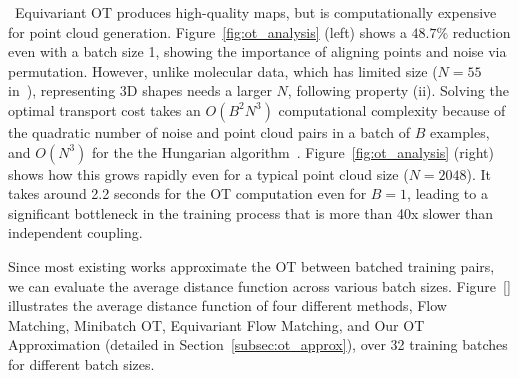  \
Equivariant OT produces high-quality maps, but is computationally expensive for point cloud generation. %
Figure~\ref{fig:ot_analysis} (left) shows a $48.7\%$ reduction even with a batch size 1, showing the importance of aligning points and noise via permutation.
However, unlike molecular data, which has limited size ($N$$=$$55$ in~\cite{klein2024equivariant}), representing 3D shapes needs a larger $N$, following property (ii). 
Solving the optimal transport cost takes an $O(B^2 N^3)$ computational complexity because of the quadratic number of noise and point cloud pairs in a batch of $B$ examples, and $O(N^3)$ for the the Hungarian algorithm~\cite{kuhn1955hungarian}. Figure~\ref{fig:ot_analysis} (right) shows how this grows rapidly even for a typical point cloud size ($N=2048$).
%
It takes around 2.2 seconds for the OT computation even for $B = 1$, leading to a significant bottleneck in the training process that is more than 40x slower than independent coupling.

%
Since most existing works approximate the OT between batched training pairs, we can evaluate the average distance function across various batch sizes.
%
Figure~\ref{} illustrates the average distance function of four different methods, Flow Matching, Minibatch OT, Equivariant Flow Matching, and Our OT Approximation (detailed in Section~\ref{subsec:ot_approx}), over 32 training batches for different batch sizes.

